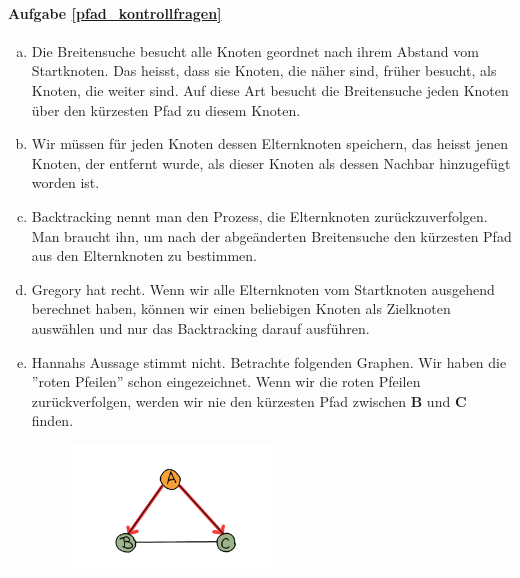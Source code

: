 \paragraph{Aufgabe \ref{pfad_kontrollfragen}}
\begin{enumerate}[(a)]
\item Die Breitensuche besucht alle Knoten geordnet nach ihrem Abstand vom Startknoten. Das heisst, dass sie Knoten, die näher sind, früher besucht, als Knoten, die weiter sind. Auf diese Art besucht die Breitensuche jeden Knoten über den kürzesten Pfad zu diesem Knoten.

\item Wir müssen für jeden Knoten dessen Elternknoten speichern, das heisst jenen Knoten, der entfernt wurde, als dieser Knoten als dessen Nachbar hinzugefügt worden ist.

\item Backtracking nennt man den Prozess, die Elternknoten zurückzuverfolgen. Man braucht ihn, um nach der abgeänderten Breitensuche den kürzesten Pfad aus den Elternknoten zu bestimmen.

\item Gregory hat recht. Wenn wir alle Elternknoten vom Startknoten ausgehend berechnet haben, können wir einen beliebigen Knoten als Zielknoten auswählen und nur das Backtracking darauf ausführen.

\item Hannahs Aussage stimmt nicht. Betrachte folgenden Graphen. Wir haben die ''roten Pfeilen'' schon eingezeichnet. Wenn wir die roten Pfeilen zurückverfolgen, werden wir nie den kürzesten Pfad zwischen \textbf{B} und \textbf{C} finden.
    \begin{figure}[H]
        \centering
        \includegraphics[width=0.5\textwidth]{Pictures/SP/eltern_kreis3.png}
    \end{figure}
\end{enumerate}

